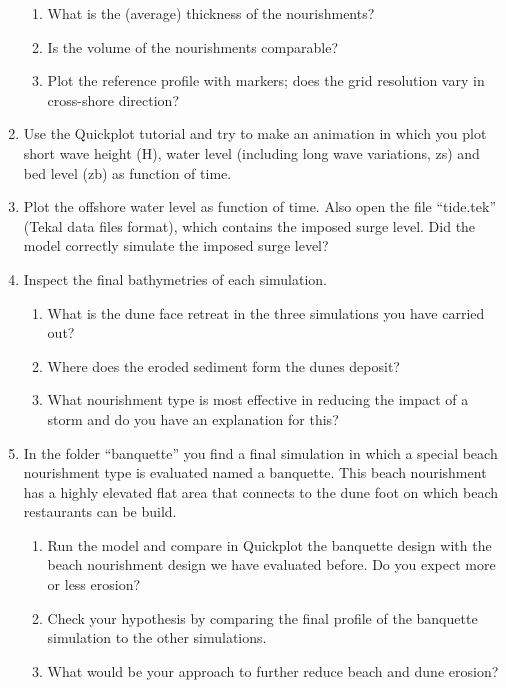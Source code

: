\documentclass{article}
\begin{document}
\begin{enumerate}
\begin{enumerate}
\item  What is the (average) thickness of the nourishments? 

\item  Is the volume of the nourishments comparable? 

\item  Plot the reference profile with markers; does the grid resolution vary in cross-shore direction?    
\end{enumerate}

\item  Use the Quickplot tutorial and try to make an animation in which you plot short wave height (H), water level (including long wave variations, zs) and bed level (zb) as function of time.

\item  Plot the offshore water level as function of time. Also open the file ``tide.tek'' (Tekal data files format), which contains the imposed surge level. Did the model correctly simulate the imposed surge level?

\item  Inspect the final bathymetries of each simulation.

\begin{enumerate}
\item  What is the dune face retreat in the three simulations you have carried out?

\item  Where does the eroded sediment form the dunes deposit?

\item  What nourishment type is most effective in reducing the impact of a storm and do you have an explanation for this?
\end{enumerate}

\item  In the folder ``banquette'' you find a final simulation in which a special beach nourishment type is evaluated named a banquette. This beach nourishment has a highly elevated flat area that connects to the dune foot on which beach restaurants can be build.

\begin{enumerate}
\item  Run the model and compare in Quickplot the banquette design with the beach nourishment design we have evaluated before. Do you expect more or less erosion?

\item  Check your hypothesis by comparing the final profile of the banquette simulation to the other simulations.

\item  What would be your approach to further reduce beach and dune erosion? 
\end{enumerate}
\end{enumerate}
\end{document}
